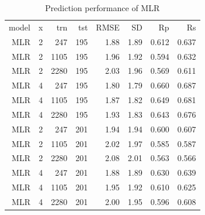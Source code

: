 \documentclass[journal=jacsat,manuscript=article]{achemso}
\begin{document}
\begin{table}
\caption{Prediction performance of MLR}
\label{tbl:performance}
\begin{tabular}{rrrrrrrr}
\hline
model & x & trn & tst & RMSE & SD & Rp & Rs\\
MLR & 2 &  247 & 195 & 1.88 & 1.89 & 0.612 & 0.637\\
MLR & 2 & 1105 & 195 & 1.96 & 1.92 & 0.594 & 0.632\\
MLR & 2 & 2280 & 195 & 2.03 & 1.96 & 0.569 & 0.611\\
MLR & 4 &  247 & 195 & 1.80 & 1.79 & 0.660 & 0.687\\
MLR & 4 & 1105 & 195 & 1.87 & 1.82 & 0.649 & 0.681\\
MLR & 4 & 2280 & 195 & 1.93 & 1.83 & 0.643 & 0.676\\
MLR & 2 &  247 & 201 & 1.94 & 1.94 & 0.600 & 0.607\\
MLR & 2 & 1105 & 201 & 2.02 & 1.97 & 0.585 & 0.587\\
MLR & 2 & 2280 & 201 & 2.08 & 2.01 & 0.563 & 0.566\\
MLR & 4 &  247 & 201 & 1.88 & 1.89 & 0.630 & 0.639\\
MLR & 4 & 1105 & 201 & 1.95 & 1.92 & 0.610 & 0.625\\
MLR & 4 & 2280 & 201 & 2.00 & 1.95 & 0.596 & 0.608\\
\hline
\end{tabular}
\end{table}
\end{document}
